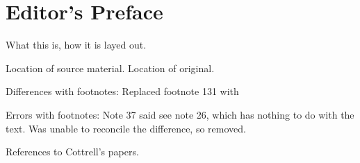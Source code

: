 \chapter{Editor's Preface}
\label{ch:editor}

What this is, how it is layed out.

Location of source material. Location of original.

Differences with footnotes:
Replaced footnote 131 with 

Errors with footnotes:
Note 37 said see note 26, which has nothing to do with the text.
Was unable to reconcile the difference, so removed.


References to Cottrell's papers.
